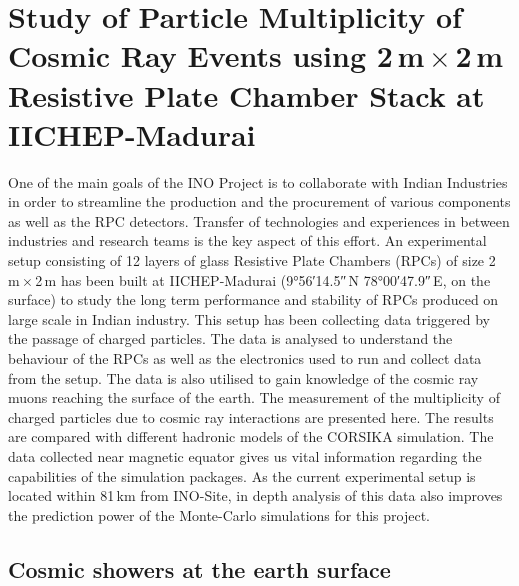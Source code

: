 \chapter{Study of Particle Multiplicity of Cosmic Ray Events using
  2\,m\,$\times$\,2\,m Resistive Plate Chamber Stack at IICHEP-Madurai}
\label{chapter:multi}

One of the main goals of the INO Project is to collaborate with Indian
Industries in order to streamline the production and the procurement
of various components as well as the RPC detectors. Transfer of
technologies and experiences in between industries and research teams
is the key aspect of this effort.
An experimental setup consisting of 12 layers of glass Resistive Plate
Chambers (RPCs) of size 2\,m\,$\times$\,2\,m has been built at
IICHEP-Madurai (\ang{9;56;14.5}\,N \ang{78;00;47.9}\,E, on the surface)
to study the long term performance and stability of RPCs produced on
large scale in Indian industry. This setup has been collecting data
triggered by the passage of charged particles. The data is analysed
to understand the behaviour of the RPCs as well as the electronics
used to run and collect data from the setup. The data is also utilised
to gain knowledge of the cosmic ray muons reaching the surface of
the earth. The measurement of the multiplicity of charged particles due to
cosmic ray interactions are presented here. The results are compared
with different hadronic models of the CORSIKA simulation. The data
collected near magnetic equator gives us vital information regarding
the capabilities of the simulation packages. As the current
experimental setup is located within 81\,km from INO-Site, in depth
analysis of this data also improves the prediction power of
the Monte-Carlo simulations for this project.

\section{Cosmic showers at the earth surface}

